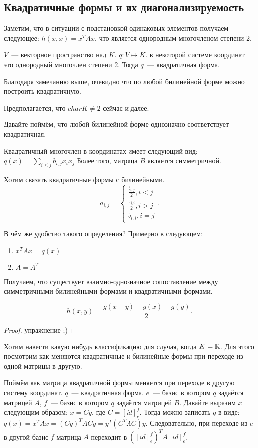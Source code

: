 \subsection{Квадратичные формы и их диагонализируемость}
\begin{remark}
    Заметим, что в ситуации с подстановкой одинаковых элементов получаем следующее:
    $h(x,x) = x^TAx$, что является однородным многочленом степени 2.
\end{remark}
\begin{definition}
    $V$~--- векторное пространство над $K$. $q\colon V\mapsto K$. 
    в некоторой системе координат это однородный многочлен степени 2.
    Тогда $q$~--- квадратичная форма.
\end{definition}
Благодаря замечанию выше, очевидно что по любой билинейной форме можно построить
квадратичную.
\begin{remark}
    Предполагается, что $char K \not= 2$ сейчас и далее.
\end{remark}
Давайте поймём, что любой билинейной форме однозначно соответствует квадратичная.
\begin{remark}
    Квадратичный многочлен в координатах имеет следующий вид:
    $q(x) = \sum\limits_{i\le j}^{}{b_{i,j} x_i x_j}$
    Более того, матрица $B$ является симметричной.
\end{remark}
Хотим связать квадратичные формы с билинейными.
 \[
 a_{i,j} = 
 \begin{cases}
     \frac{b_{i,j}}{2}, i < j\\
     \frac{b_{j,i}}{2}, i > j\\
     b_{i,i}, i = j
 \end{cases}
.\] 

В чём же удобство такого определения? Примерно в следующем:
\begin{enumerate}
    \item
        $x^TAx = q(x)$
    \item
         $A = A^T$
\end{enumerate}
Получаем, что существует взаимно-однозначное сопоставление между
симметричными билинейными формами и квадратичными формами.

\begin{statement}
     \[
    h(x, y) = \frac{g(x + y) - g(x) - g(y)}{2}
    .\] 
\end{statement}
\begin{proof}
    упражнение ;)
\end{proof}
\begin{motivation}
    Хотим навести какую нибудь классификацию для случая, когда $K = \mathbb{R}$.
    Для этого посмотрим как меняются квадратичные и билинейные формы при переходе из одной матрицы в другую.
\end{motivation}
Поймём как матрица квадратичной формы меняется при переходе в другую систему координат.
$q$~--- квадратичная форма. $e$~--- базис в котором $q$ задаётся матрицей $A$,
$f$~--- базис в котором $q$ задаётся матрицей $B$.
Давайте выразим $x$ следующим образом: $x = Cy$, где $C = [id]^f_e$.
Тогда можно записать $q$ в виде: $q(x) = x^T A x = (Cy)^T AC y = y^T (C^TAC) y$.
Следовательно, при переходе из $e$ в другой базис $f$ матрица $A$ переходит в $([id]^f_e)^T A [id]^f_e$.

